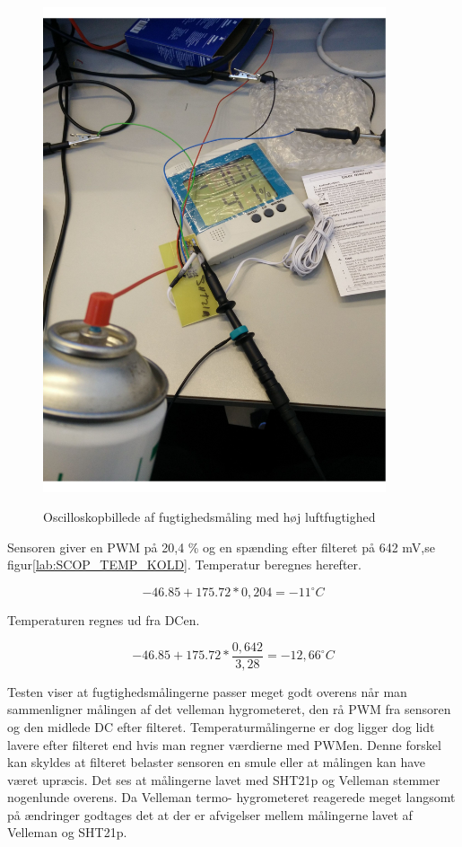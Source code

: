 \begin{figure}[H]
\centering
{\includegraphics[width=0.90\textwidth]{filer/modultest/Billeder/test_KOLD}}
\caption{Oscilloskopbillede af fugtighedsmåling med høj luftfugtighed}
\label{lab:TEST_KOLD}
\end{figure}

Sensoren giver en PWM på 20,4 \% og en spænding efter filteret på 642 mV,se figur\ref{lab:SCOP_TEMP_KOLD}. Temperatur beregnes herefter.


\begin{equation}
-46.85+175.72*0,204=-11^{\circ}C
\end{equation}

Temperaturen regnes ud fra DCen. 

\begin{equation}
-46.85+175.72*\frac{0,642}{3,28}=-12,66^{\circ}C
\end{equation}


Testen viser at fugtighedsmålingerne passer meget godt overens når man sammenligner målingen af det velleman hygrometeret, den rå PWM fra sensoren og den midlede DC efter filteret. Temperaturmålingerne er dog ligger dog lidt lavere efter filteret end hvis man regner værdierne med PWMen. Denne forskel kan skyldes at filteret belaster sensoren en smule eller at målingen kan have været upræcis. Det ses at målingerne lavet med SHT21p og Velleman stemmer nogenlunde overens. Da Velleman termo- hygrometeret reagerede meget langsomt på ændringer godtages det at der er afvigelser mellem målingerne lavet af Velleman og SHT21p. 


